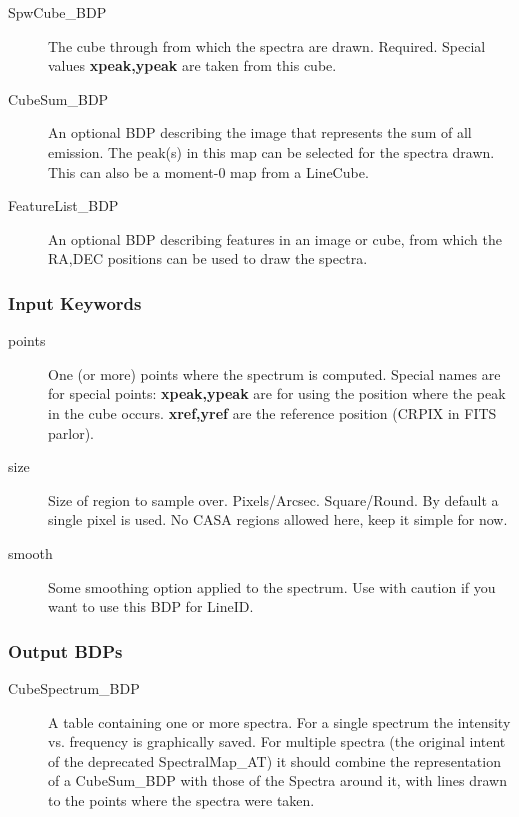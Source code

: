 \begin{description}

\item[SpwCube\_BDP] The cube through from which the spectra are drawn. Required.
Special values {\bf xpeak,ypeak} are taken from this cube.

\item[CubeSum\_BDP] An optional BDP describing the image that represents the sum
of all emission. The peak(s) in this map can be selected for the spectra drawn.
This can also be a moment-0 map from a LineCube.

\item[FeatureList\_BDP] An optional BDP describing features in an image or cube,
from which the RA,DEC positions can be used to draw the spectra.


\end{description}


\subsubsection{Input Keywords}

\begin{description}

\item[points] One (or more) points where the spectrum is computed.
Special names are for special points:  {\bf xpeak,ypeak} are for using 
the position where the peak in the cube occurs.  {\bf xref,yref} are the
reference position (CRPIX in FITS parlor).

\item[size] Size of region to sample over. Pixels/Arcsec.  Square/Round.  
By default a single pixel is used. No CASA regions allowed here, keep
it simple for now.

\item[smooth] Some smoothing option applied to the spectrum. Use with
caution if you want to use this BDP for LineID.

\end{description}

\subsubsection{Output BDPs}

\begin{description}

\item[CubeSpectrum\_BDP] A table containing one or more spectra. For a single
spectrum the intensity vs. frequency is graphically saved. For multiple
spectra (the original intent of the deprecated SpectralMap\_AT) it should
combine the representation of a CubeSum\_BDP with those of the Spectra
around it, with lines drawn to the points where the spectra were taken.

\end{description}


